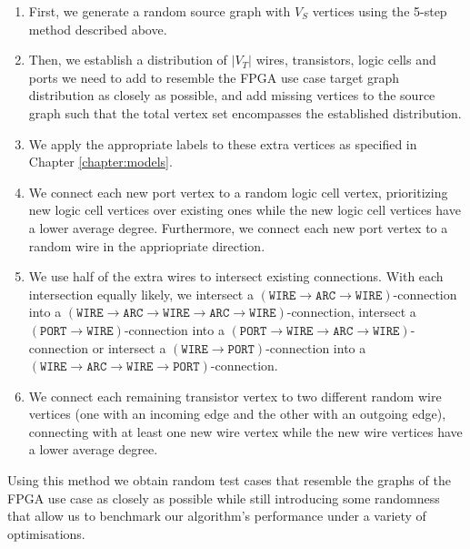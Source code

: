 \begin{enumerate}
\item First, we generate a random source graph with $V_S$ vertices using the 5-step method described above.
\item Then, we establish a distribution of $|V_T|$ wires, transistors, logic cells and ports we need to add to resemble the FPGA use case target graph distribution as closely as possible, and add missing vertices to the source graph such that the total vertex set encompasses the established distribution.
\item We apply the appropriate labels to these extra vertices as specified in Chapter \ref{chapter:models}.
\item We connect each new port vertex to a random logic cell vertex, prioritizing new logic cell vertices over existing ones while the new logic cell vertices have a lower average degree. Furthermore, we connect each new port vertex to a random wire in the appriopriate direction.
\item We use half of the extra wires to intersect existing connections. With each intersection equally likely, we intersect a $(\mathtt{WIRE} \to \mathtt{ARC} \to \mathtt{WIRE})$-connection into a $(\mathtt{WIRE} \to \mathtt{ARC} \to \mathtt{WIRE} \to \mathtt{ARC} \to \mathtt{WIRE})$-connection, intersect a $(\mathtt{PORT} \to \mathtt{WIRE})$-connection into a $(\mathtt{PORT} \to \mathtt{WIRE} \to \mathtt{ARC} \to \mathtt{WIRE})$-connection or intersect a  $(\mathtt{WIRE} \to \mathtt{PORT})$-connection into a $(\mathtt{WIRE} \to \mathtt{ARC} \to \mathtt{WIRE} \to \mathtt{PORT})$-connection.
\item We connect each remaining transistor vertex to two different random wire vertices (one with an incoming edge and the other with an outgoing edge), connecting with at least one new wire vertex while the new wire vertices have a lower average degree.
\end{enumerate}

Using this method we obtain random test cases that resemble the graphs of the FPGA use case as closely as possible while still introducing some randomness that allow us to benchmark our algorithm's performance under a variety of optimisations.

